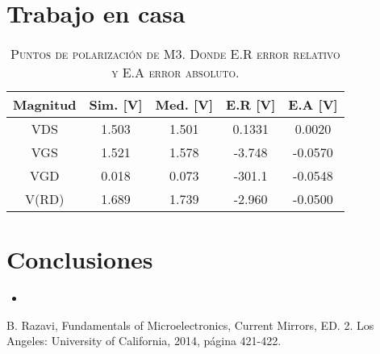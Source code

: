 \documentclass[twocolumns,12pt]{IEEEtran}
\begin{document}
\section{Trabajo en casa}


\begin{table}[H]
    \centering
    \caption{\textsc{\footnotesize Puntos de polarización de M3. Donde E.R error relativo y E.A error absoluto.}}
    \label{Tabla 1}
    \begin{tabular}{@{}ccccc@{}}
    \toprule
    \toprule
    Magnitud  &Sim. [V] & Med. [V] &E.R [V] &E.A [V]\\ \midrule

  VDS    &  1.503  &  1.501  &  0.1331  &  0.0020  \\


  VGS    &  1.521  &  1.578  &  -3.748  &  -0.0570  \\


  VGD    &  0.018  &  0.073  &  -301.1  &  -0.0548  \\


  V(RD)   &  1.689  &  1.739  &  -2.960  &  -0.0500  \\


    
     \bottomrule \bottomrule
    \end{tabular}
\end{table}




\section{Conclusiones}
\begin{itemize}
\item 

\end{itemize}



\begin{thebibliography}{1}

 B. Razavi, Fundamentals of Microelectronics, Current Mirrors, ED. 2. Los Angeles: University of California, 2014, 
página 421-422.  

\end{thebibliography}
\end{document}
